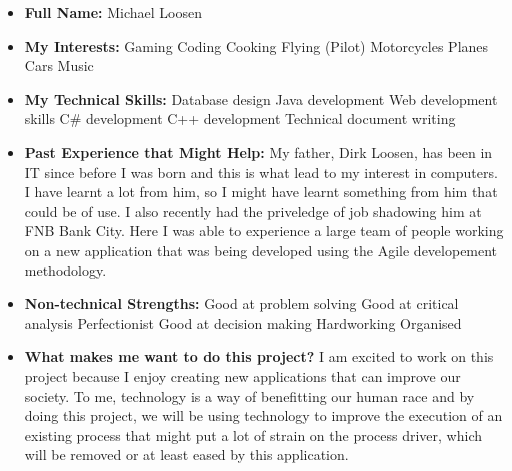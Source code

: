 \documentclass{article}
\begin{document}
	\begin{itemize}
		\item \textbf{Full Name:} Michael Loosen
		\item \textbf{My Interests:}
		\subitem Gaming
		\subitem Coding
		\subitem Cooking
		\subitem Flying (Pilot)
		\subitem Motorcycles
		\subitem Planes
		\subitem Cars
		\subitem Music
		
		\item \textbf{My Technical Skills:}
		\subitem Database design
		\subitem Java development
		\subitem Web development skills		
		\subitem C\# development
		\subitem C++ development
		\subitem Technical document writing
		
		\item \textbf{Past Experience that Might Help:} \newline
		My father, Dirk Loosen, has been in IT since before I was born and this is what lead to my interest in computers. I have learnt a lot from him, so I might have learnt something from him that could be of use. I also recently had the priveledge of job shadowing him at FNB Bank City. Here I was able to experience a large team of people working on a new application that was being developed using the Agile developement methodology.
		
		\item \textbf{Non-technical Strengths:}
		\subitem Good at problem solving
		\subitem Good at critical analysis
		\subitem Perfectionist		
		\subitem Good at decision making
		\subitem Hardworking
		\subitem Organised
		
		\item \textbf{What makes me want to do this project?} \newline
		I am excited to work on this project because I enjoy creating new applications that can improve our society. To me, technology is a way of benefitting our human race and by doing this project, we will be using technology to improve the execution of an existing process that might put a lot of strain on the process driver, which will be removed or at least eased by this application.
	\end{itemize}
	
	
\end{document}
